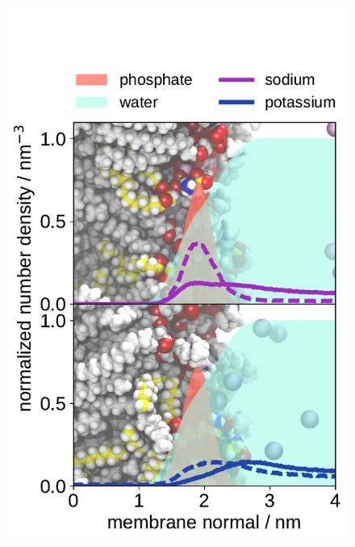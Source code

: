 \documentclass[journal=jpcbfk,manuscript=article]{achemso}
\newlength{\figheightsmall}
\newlength{\figheight}
\begin{document}
\begin{figure}[!tbp] 
  \centering 
  \includegraphics[height=\figheightsmall]{../img/ecc_pops/density_profiles_na-k-counterions_wat_phos_compar_5PC-1PS_ecclipids-lipid17.pdf}

\end{figure}
\end{document}
